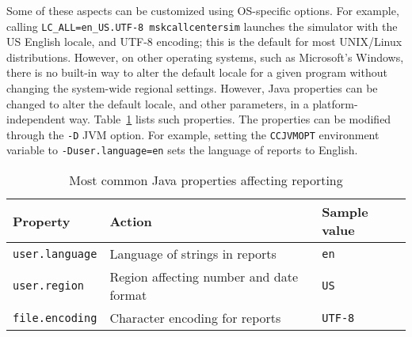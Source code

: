 Some of these aspects can be customized using OS-specific options.
For example, calling \texttt{LC\_ALL=en\_US.UTF-8 mskcallcentersim}
launches the simulator with the US English locale, and UTF-8 encoding;
this is the default for most UNIX/Linux distributions.
However, on other operating systems, such as Microsoft's Windows,
there is no built-in way to alter the default locale for a given
program without changing the system-wide regional settings.
However, Java properties can be changed to alter the default locale,
and other parameters, in a platform-independent way.
Table~\ref{tab:repjavaprop} lists such properties.
The properties can be modified through the \texttt{-D} JVM option.
For example, setting the \texttt{CCJVMOPT} environment variable
to \texttt{-Duser.language=en} sets the language of reports to
English.

\begin{table}
\caption{Most common Java properties affecting reporting}
\label{tab:repjavaprop}

\centering\begin{tabular}{|l|ll|}\hline
Property & Action & Sample value \\ \hline
\texttt{user.language} & Language of strings in reports & \texttt{en}
\\
\texttt{user.region} & Region affecting number and date format &
\texttt{US} \\
\texttt{file.encoding}  & Character encoding for reports &
\texttt{UTF-8} \\
\hline
\end{tabular}
\end{table}
